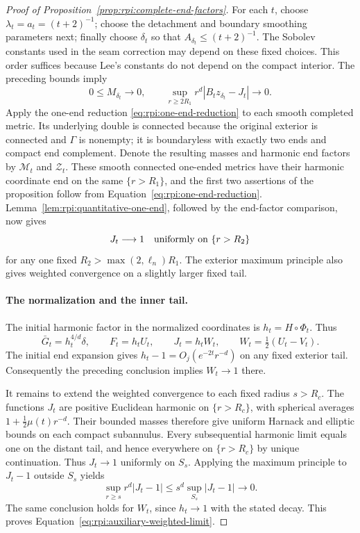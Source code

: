 \begin{proof}[Proof of Proposition~\ref{prop:rpi:complete-end-factors}]
For each $t$, choose $\lambda_t=a_t=(t+2)^{-1}$; choose the
detachment and boundary smoothing parameters next; finally choose
$\delta_t$ so that $A_{\delta_t}\le(t+2)^{-1}$.
The Sobolev constants used in the seam correction may depend on
these fixed choices.  This order suffices because Lee's constants
do not depend on the compact interior.  The preceding bounds imply
\[
 0\le M_{\delta_t}\longrightarrow0,\qquad
 \sup_{r\ge2R_1}r^d|B_tz_{\delta_t}-J_t|\longrightarrow0.
\]
Apply the one-end reduction
\eqref{eq:rpi:one-end-reduction} to each smooth completed metric.
Its underlying double is connected because the original exterior is
connected and $\Gamma$ is nonempty; it is boundaryless with exactly
two ends and compact end complement.
Denote the resulting masses and harmonic end factors by
$\mathcal M_t$ and $\mathcal Z_t$. These smooth connected one-ended
metrics have their harmonic coordinate end on the same $\{r>R_1\}$,
and the first two assertions of the proposition follow from
Equation~\eqref{eq:rpi:one-end-reduction}.
Lemma~\ref{lem:rpi:quantitative-one-end}, followed by the
end-factor comparison, now gives
\[
 J_t\longrightarrow1
 \quad\hbox{uniformly on }\{r>R_2\}
\]
for any one fixed $R_2>\max(2,\ell_n)R_1$.
The exterior maximum principle also gives weighted convergence on
a slightly larger fixed tail.

\paragraph{The normalization and the inner tail.}
The initial harmonic factor in the normalized coordinates is
$h_t=H\circ\Phi_t$. Thus
\[
 \bar G_t=h_t^{4/d}\delta,\qquad
 F_t=h_tU_t,\qquad J_t=h_tW_t,\qquad
 W_t=\tfrac12(U_t-V_t).
\]
The initial end expansion gives
$h_t-1=O_j(e^{-2t}r^{-d})$ on any fixed exterior tail.
Consequently the preceding conclusion implies $W_t\to1$ there.

It remains to extend the weighted convergence to each fixed radius
$s>R_c$. The functions $J_t$ are positive Euclidean harmonic
on $\{r>R_c\}$, with spherical averages
$1+\tfrac12\mu(t) r^{-d}$.  Their bounded masses therefore give
uniform Harnack and elliptic bounds on each compact subannulus.
Every subsequential harmonic limit equals one on the distant tail,
and hence everywhere on $\{r>R_c\}$ by unique continuation.
Thus $J_t\to1$ uniformly on $S_s$.  Applying the maximum principle
to $J_t-1$ outside $S_s$ yields
\[
 \sup_{r\ge s}r^d|J_t-1|
 \le s^d\sup_{S_s}|J_t-1|\longrightarrow0.
\]
The same conclusion holds for $W_t$, since $h_t\to1$ with the
stated decay. This proves Equation~\eqref{eq:rpi:auxiliary-weighted-limit}.
\end{proof}

